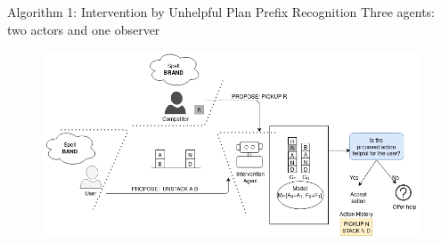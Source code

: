 \begin{frame}{Algorithm 1: Intervention by Unhelpful Plan Prefix Recognition}
Three agents: two actors and one observer
\begin{figure}[!ht]
  \centering
\includegraphics[width=1.1\columnwidth]{img/bw.png}
\end{figure}
\end{frame}